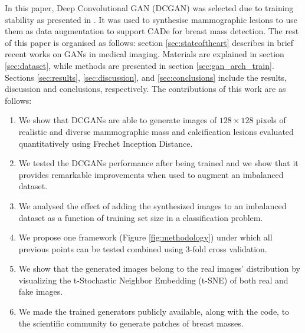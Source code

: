 \documentclass[final,3p,twocolumn,authoryear,sort&compress,times]{maia}
\begin{document}
In this paper, Deep Convolutional GAN (DCGAN) was selected due to training stability as presented in \citet{radford_DCGAN}. It was used to synthesise mammographic lesions to use them as data augmentation to support CADe for breast mass detection.
The rest of this paper is organised as follows: section \ref{sec:stateoftheart} describes in brief recent works on GANs in medical imaging. Materials are explained in section \ref{sec:dataset}, while methods are presented in section \ref{sec:gan_arch_train}. Sections \ref{sec:results}, \ref{sec:discussion}, and \ref{sec:conclusions} include the results, discussion and conclusions, respectively.
The contributions of this work are as follows:
\begin{enumerate}
    \item We show that DCGANs are able to generate images of $128 \times 128$ pixels of realistic and diverse mammographic mass and calcification lesions evaluated quantitatively using Frechet Inception Distance.
    \item We tested the DCGANs performance after being trained and we show that it provides remarkable improvements when used to augment an imbalanced dataset.
    \item We analysed the effect of adding the synthesized images to an imbalanced dataset as a function of training set size in a classification problem.
     \item We propose one framework (Figure \ref{fig:methodology}) under which all previous points can be tested combined using 3-fold cross validation.
     \item We show that the generated images belong to the real images' distribution by visualizing the t-Stochastic Neighbor Embedding (t-SNE) of both real and fake images.
     \item We made the trained generators publicly available, along with the code, to the scientific community to generate patches of breast masses.
\end{enumerate}
\end{document}
